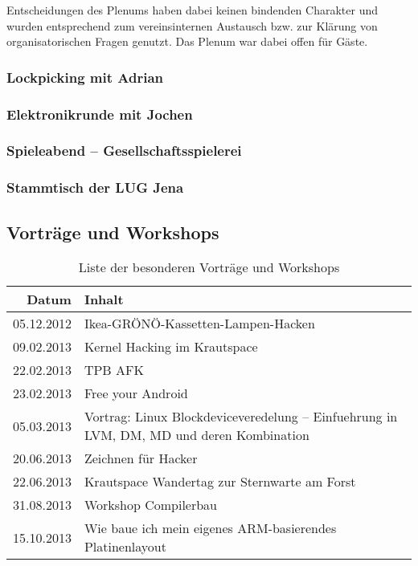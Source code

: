 \documentclass[10pt,DIV16]{scrartcl}
\begin{document}
Entscheidungen des Plenums haben dabei keinen bindenden Charakter
und wurden entsprechend zum vereinsinternen Austausch bzw. zur
Klärung von organisatorischen Fragen genutzt. Das Plenum war dabei
offen für Gäste.

\subsubsection{Lockpicking mit Adrian}

\subsubsection{Elektronikrunde mit Jochen}

\subsubsection{Spieleabend -- Gesellschaftsspielerei}

\subsubsection{Stammtisch der LUG Jena}

\subsection{Vorträge und Workshops}

\begin{table}[h]
\begin{tabular}{r|l}
	\textbf{Datum} & \textbf{Inhalt} \\ \hline{}
	05.12.2012 & Ikea-GRÖNÖ-Kassetten-Lampen-Hacken\\
	09.02.2013 & Kernel Hacking im Krautspace\\
	22.02.2013 & TPB AFK\\
	23.02.2013 & Free your Android\\
	05.03.2013 & Vortrag: Linux Blockdeviceveredelung -- Einfuehrung in LVM, DM, MD und deren Kombination\\
	20.06.2013 & Zeichnen für Hacker\\
	22.06.2013 & Krautspace Wandertag zur Sternwarte am Forst\\
	31.08.2013 & Workshop Compilerbau\\
	15.10.2013 & Wie baue ich mein eigenes ARM-basierendes Platinenlayout
	\end{tabular}
	\caption{Liste der besonderen Vorträge und Workshops}
\end{table}
\end{document}
